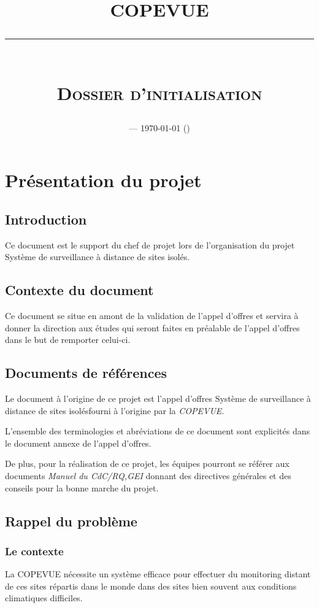 \documentclass[a4paper, 11pt, draft]{report}
\title{\textbf{COPEVUE}\\
\rule{\textwidth}{1pt}{}\\
\Huge{\textsc{Dossier d'initialisation}}}
\author{\docauthor{}}
\date{\docname{} --- \today{} (\docstatus{})}
\newcommand{\ssdsi}{Système de surveillance à distance de sites isolés}
\begin{document}
\maketitle

\tableofcontents

\pagebreak

\chapter{Présentation du projet}

\section{Introduction}

Ce document est le support du chef de projet lors de l'organisation du projet \ssdsi.

\section{Contexte du document}

Ce document se situe en amont de la validation de l'appel d'offres et servira à donner la direction aux études qui seront faites en préalable de l'appel d'offres dans le but de remporter celui-ci.

\section{Documents de références}

Le document à l'origine de ce projet est l'appel d'offres \ssdsi fourni à l'origine par la \emph{COPEVUE}.

L'ensemble des terminologies et abréviations de ce document sont explicités dans le document annexe de l'appel d'offres.

De plus, pour la réalisation de ce projet, les équipes pourront se référer aux documents \emph{Manuel du CdC/RQ,GEI} donnant des directives générales et des conseils pour la bonne marche du projet.

\section{Rappel du problème}
    \subsection{Le contexte}

    La COPEVUE nécessite un système efficace pour effectuer du monitoring distant de ces sites répartis dans le monde dans des sites bien souvent aux conditions climatiques difficiles.
\end{document}
